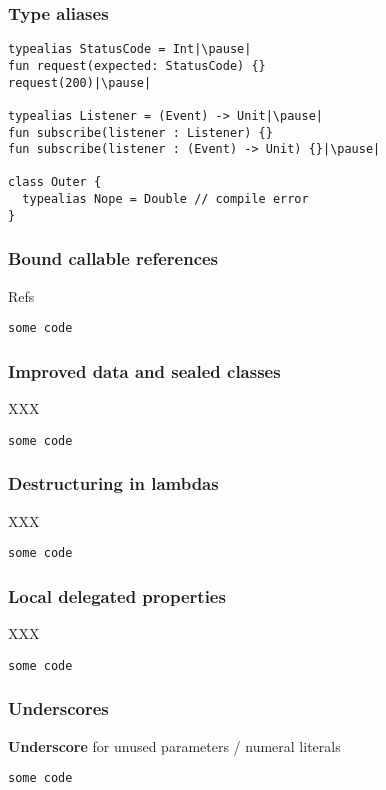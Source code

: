 
\begin{frame}[fragile] \frametitle{Type aliases}
\begin{lstlisting}
typealias StatusCode = Int|\pause|
fun request(expected: StatusCode) {}
request(200)|\pause|

typealias Listener = (Event) -> Unit|\pause|
fun subscribe(listener : Listener) {}
fun subscribe(listener : (Event) -> Unit) {}|\pause|

class Outer {
  typealias Nope = Double // compile error
}
\end{lstlisting}
\end{frame}


\begin{frame}[fragile] \frametitle{Bound callable references}
Refs
\begin{lstlisting}
some code
\end{lstlisting}
\end{frame}


\begin{frame}[fragile] \frametitle{Improved data and sealed classes}
XXX
\begin{lstlisting}
some code
\end{lstlisting}
\end{frame}


\begin{frame}[fragile] \frametitle{Destructuring in lambdas}
XXX
\begin{lstlisting}
some code
\end{lstlisting}
\end{frame}


\begin{frame}[fragile] \frametitle{Local delegated properties}
XXX
\begin{lstlisting}
some code
\end{lstlisting}
\end{frame}


\begin{frame}[fragile] \frametitle{Underscores}
\textbf{Underscore} for unused parameters / numeral literals %
\begin{lstlisting}
some code
\end{lstlisting}
\end{frame}

